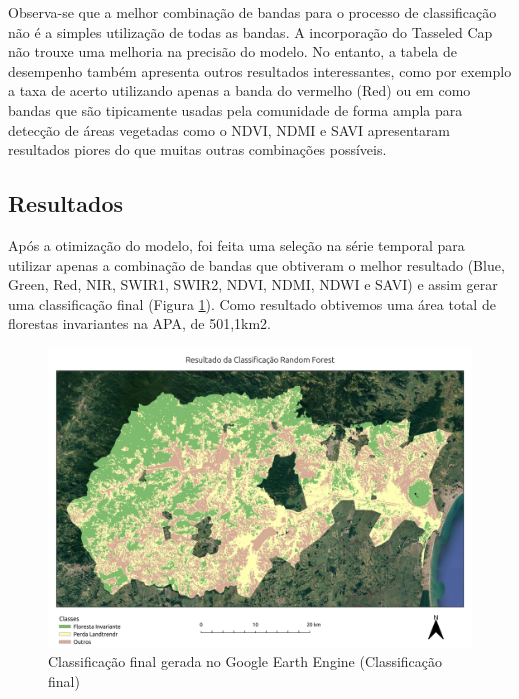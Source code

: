Observa-se que a melhor combinação de bandas para o processo de classificação não é a simples utilização de todas as bandas. A incorporação do Tasseled Cap não trouxe uma melhoria na precisão do modelo. No entanto, a tabela de desempenho também apresenta outros resultados interessantes, como por exemplo a taxa de acerto utilizando apenas a banda do vermelho (Red) ou em como bandas que são tipicamente usadas pela comunidade de forma ampla para detecção de áreas vegetadas como o NDVI, NDMI e SAVI apresentaram resultados piores do que muitas outras combinações possíveis. 

\subsection{Resultados}

\hspace{13pt} Após a otimização do modelo, foi feita uma seleção na série temporal para utilizar apenas a combinação de bandas que obtiveram o melhor resultado (Blue, Green, Red, NIR, SWIR1, SWIR2, NDVI, NDMI, NDWI e SAVI) e assim gerar uma classificação final (Figura \ref{fig:bhrsj_class_final}). Como resultado obtivemos uma área total de florestas invariantes na APA, de 501,1km2.

\begin{figure}[h!]
    \centering
    \includegraphics[scale=.5]{images/bhrsj_class_final.pdf}
    \caption{Classificação final gerada no Google Earth Engine (Classificação final)}
    \label{fig:bhrsj_class_final}
\end{figure}

\newpage

